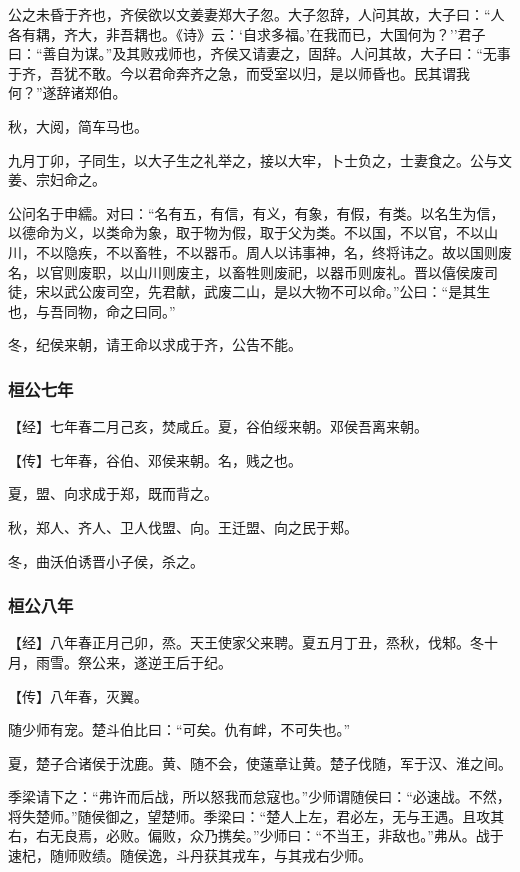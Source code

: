 \documentclass[]{article}
\begin{document}
公之未昏于齐也，齐侯欲以文姜妻郑大子忽。大子忽辞，人问其故，大子曰：``人各有耦，齐大，非吾耦也。《诗》云：`自求多福。'在我而已，大国何为？''君子曰：``善自为谋。''及其败戎师也，齐侯又请妻之，固辞。人问其故，大子曰：``无事于齐，吾犹不敢。今以君命奔齐之急，而受室以归，是以师昏也。民其谓我何？''遂辞诸郑伯。

秋，大阅，简车马也。

九月丁卯，子同生，以大子生之礼举之，接以大牢，卜士负之，士妻食之。公与文姜、宗妇命之。

公问名于申繻。对曰：``名有五，有信，有义，有象，有假，有类。以名生为信，以德命为义，以类命为象，取于物为假，取于父为类。不以国，不以官，不以山川，不以隐疾，不以畜牲，不以器币。周人以讳事神，名，终将讳之。故以国则废名，以官则废职，以山川则废主，以畜牲则废祀，以器币则废礼。晋以僖侯废司徒，宋以武公废司空，先君献，武废二山，是以大物不可以命。''公曰：``是其生也，与吾同物，命之曰同。''

冬，纪侯来朝，请王命以求成于齐，公告不能。

\hypertarget{header-n234}{%
\subsubsection{桓公七年}\label{header-n234}}

【经】七年春二月己亥，焚咸丘。夏，谷伯绥来朝。邓侯吾离来朝。

【传】七年春，谷伯、邓侯来朝。名，贱之也。

夏，盟、向求成于郑，既而背之。

秋，郑人、齐人、卫人伐盟、向。王迁盟、向之民于郏。

冬，曲沃伯诱晋小子侯，杀之。

\hypertarget{header-n242}{%
\subsubsection{桓公八年}\label{header-n242}}

【经】八年春正月己卯，烝。天王使家父来聘。夏五月丁丑，烝秋，伐邾。冬十月，雨雪。祭公来，遂逆王后于纪。

【传】八年春，灭翼。

随少师有宠。楚斗伯比曰：``可矣。仇有衅，不可失也。''

夏，楚子合诸侯于沈鹿。黄、随不会，使薳章让黄。楚子伐随，军于汉、淮之间。

季梁请下之：``弗许而后战，所以怒我而怠寇也。''少师谓随侯曰：``必速战。不然，将失楚师。''随侯御之，望楚师。季梁曰：``楚人上左，君必左，无与王遇。且攻其右，右无良焉，必败。偏败，众乃携矣。''少师曰：``不当王，非敌也。''弗从。战于速杞，随师败绩。随侯逸，斗丹获其戎车，与其戎右少师。
\end{document}

